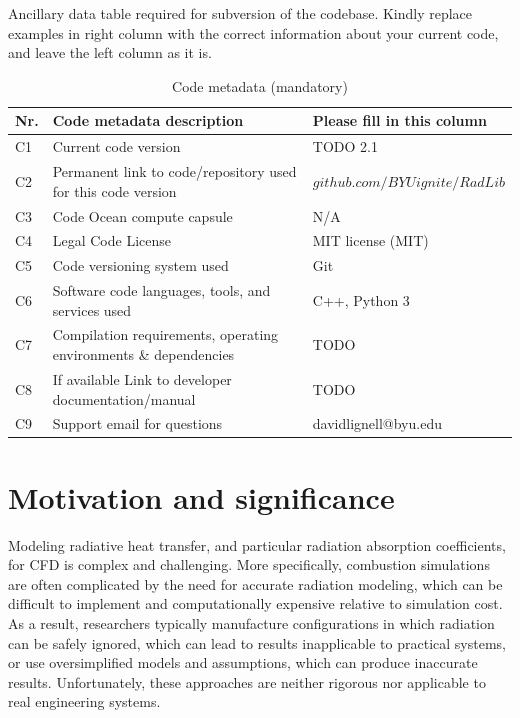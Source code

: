 \documentclass[preprint,12pt, a4paper]{elsarticle}
\begin{document}
Ancillary data table required for subversion of the codebase. Kindly replace examples in right column with the correct information about your current code, and leave the left column as it is.

\begin{table}[H]
\begin{tabular}{|l|p{6.5cm}|p{6.5cm}|}
\hline
\textbf{Nr.} & \textbf{Code metadata description} & \textbf{Please fill in this column} \\
\hline
C1 & Current code version & TODO 2.1 \\
\hline
C2 & Permanent link to code/repository used for this code version & $github.com/BYUignite/RadLib$ \\
\hline
C3 & Code Ocean compute capsule & N/A \\
\hline
C4 & Legal Code License   & MIT license (MIT) \\
\hline
C5 & Code versioning system used & Git \\
\hline
C6 & Software code languages, tools, and services used & C++, Python 3 \\
\hline
C7 & Compilation requirements, operating environments \& dependencies & TODO \\
\hline
C8 & If available Link to developer documentation/manual & TODO \\
\hline
C9 & Support email for questions & davidlignell@byu.edu \\
\hline
\end{tabular}
\caption{Code metadata (mandatory)}
\label{} 
\end{table}


\linenumbers


\section{Motivation and significance}
\label{s:motivation}

Modeling radiative heat transfer, and particular radiation absorption coefficients, for CFD is complex and challenging. More specifically, combustion simulations are often complicated by the need for accurate radiation modeling, which can be difficult to implement and computationally expensive relative to simulation cost. As a result, researchers typically manufacture configurations in which radiation can be safely ignored, which can lead to results inapplicable to practical systems, or use oversimplified models and assumptions, which can produce inaccurate results. Unfortunately, these approaches are neither rigorous nor applicable to real engineering systems. 
\end{document}
